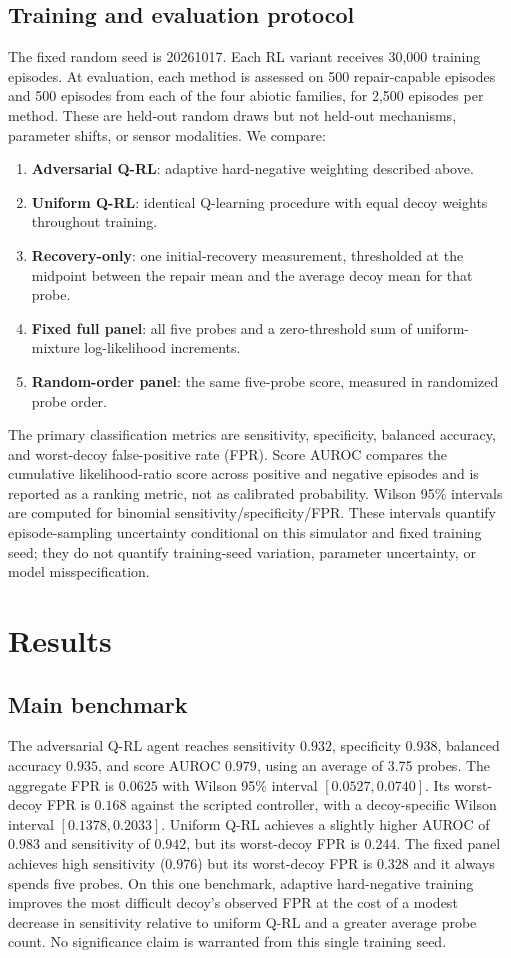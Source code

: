 \documentclass[11pt]{article}
\begin{document}
\subsection{Training and evaluation protocol}
The fixed random seed is 20261017. Each RL variant receives 30,000 training episodes. At evaluation, each method is assessed on 500 repair-capable episodes and 500 episodes from each of the four abiotic families, for 2,500 episodes per method. These are held-out random draws but not held-out mechanisms, parameter shifts, or sensor modalities. We compare:
\begin{enumerate}
\item \textbf{Adversarial Q-RL}: adaptive hard-negative weighting described above.
\item \textbf{Uniform Q-RL}: identical Q-learning procedure with equal decoy weights throughout training.
\item \textbf{Recovery-only}: one initial-recovery measurement, thresholded at the midpoint between the repair mean and the average decoy mean for that probe.
\item \textbf{Fixed full panel}: all five probes and a zero-threshold sum of uniform-mixture log-likelihood increments.
\item \textbf{Random-order panel}: the same five-probe score, measured in randomized probe order.
\end{enumerate}

The primary classification metrics are sensitivity, specificity, balanced accuracy, and worst-decoy false-positive rate (FPR). Score AUROC compares the cumulative likelihood-ratio score across positive and negative episodes and is reported as a ranking metric, not as calibrated probability. Wilson 95\% intervals are computed for binomial sensitivity/specificity/FPR. These intervals quantify episode-sampling uncertainty conditional on this simulator and fixed training seed; they do not quantify training-seed variation, parameter uncertainty, or model misspecification.

\section{Results}
\subsection{Main benchmark}
The adversarial Q-RL agent reaches sensitivity $0.932$, specificity $0.938$, balanced accuracy $0.935$, and score AUROC $0.979$, using an average of 3.75 probes. The aggregate FPR is $0.0625$ with Wilson 95\% interval $[0.0527,0.0740]$. Its worst-decoy FPR is $0.168$ against the scripted controller, with a decoy-specific Wilson interval $[0.1378,0.2033]$. Uniform Q-RL achieves a slightly higher AUROC of $0.983$ and sensitivity of $0.942$, but its worst-decoy FPR is $0.244$. The fixed panel achieves high sensitivity ($0.976$) but its worst-decoy FPR is $0.328$ and it always spends five probes. On this one benchmark, adaptive hard-negative training improves the most difficult decoy's observed FPR at the cost of a modest decrease in sensitivity relative to uniform Q-RL and a greater average probe count. No significance claim is warranted from this single training seed.
\end{document}
